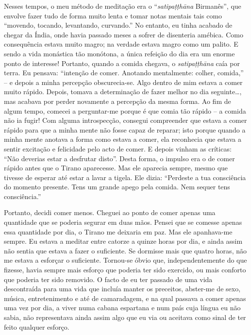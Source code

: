 Nesses tempos, o meu método de meditação era o “\emph{satipaṭṭhāna}
Birmanês”, que envolve fazer tudo de forma muito lenta e tomar notas
mentais tais como “movendo, tocando, levantando, curvando.” No entanto,
eu tinha acabado de chegar da Índia, onde havia passado meses a sofrer
de disenteria amébica. Como consequência estava muito magro; na verdade
estava magro como um palito. E sendo a vida monástica tão monótona, a
única refeição do dia era um enorme ponto de interesse! Portanto, quando
a comida chegava, o \emph{satipaṭṭhāna} caía por terra. Eu pensava:
“intenção de comer. Anotando mentalmente: colher, comida,” -- e depois a
minha percepção obscurecia-se. Algo dentro de mim estava a comer muito
rápido. Depois, tomava a determinação de fazer melhor no dia
seguinte\ldots{}, mas acabava por perder novamente a percepção da mesma
forma. Ao fim de algum tempo, comecei a perguntar-me porque é que comia
tão rápido -- a comida não ia fugir! Com alguma introspecção, consegui
compreender que estava a comer rápido para que a minha mente não fosse
capaz de reparar; isto porque quando a minha mente anotava a forma como
estava a comer, ela reconhecia que estava a sentir excitação e
felicidade pelo acto de comer. E depois vinham as críticas: “Não
deverias estar a desfrutar disto”. Desta forma, o impulso era o de comer
rápido antes que o Tirano aparecesse. Mas ele aparecia sempre, mesmo que
tivesse de esperar até estar a lavar a tigela. Ele dizia: “Perdeste a
tua consciência do momento presente. Tens um grande apego pela comida.
Nem sequer tens consciência.”

Portanto, decidi comer menos. Cheguei ao ponto de comer apenas uma
quantidade que se poderia segurar em duas mãos. Pensei que se comesse
apenas essa quantidade por dia, o Tirano me deixaria em paz. Mas ele
apanhava-me sempre. Eu estava a meditar entre catorze a quinze horas por
dia, e ainda assim não sentia que estava a fazer o suficiente. Se
dormisse mais que quatro horas, não me estava a esforçar o suficiente.
Tornou-se óbvio que, independentemente do que fizesse, havia sempre mais
esforço que poderia ter sido exercido, ou mais conforto que poderia ter
sido removido. O facto de eu ter passado de uma vida descontraída para
uma vida que incluía manter os preceitos, abster-me de sexo, música,
entretenimento e até de camaradagem, e na qual passava a comer apenas
uma vez por dia, a viver numa cabana espartana e num país cuja língua eu
não sabia, não representava ainda assim algo que eu via ou aceitava como
sinal de ter feito qualquer esforço.

